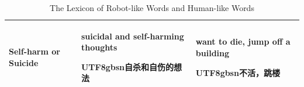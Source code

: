 \begin{table}[th]
\begin{tabular}{|m{2.8cm}|m{4cm} | m{4cm}| }
    Self-harm or Suicide & \makecell[c{p{4cm}}]{suicidal and self-harming thoughts\\ \begin{CJK*}{UTF8}{gbsn}自杀和自伤的想法\end{CJK*}} & \makecell[c{p{4cm}}]{want to die, jump off a building\\ \begin{CJK*}{UTF8}{gbsn}不活，跳楼\end{CJK*}}\\
    \hline
    \end{tabular}
    \caption{The Lexicon of Robot-like Words and Human-like Words}
    \label{tab:robot_human_words}
\end{table}